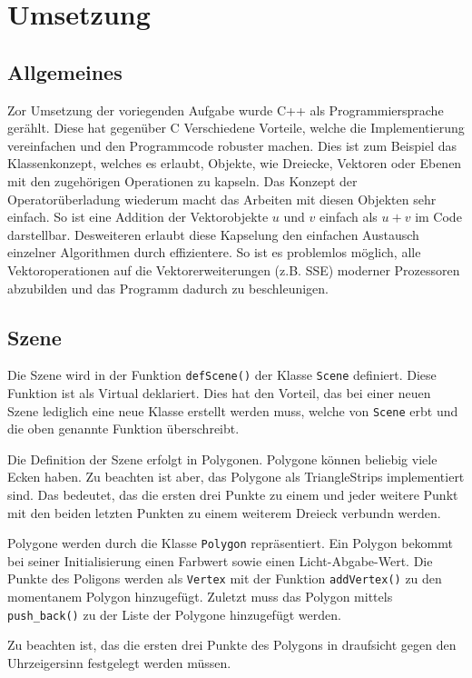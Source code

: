 \documentclass[final,a4paper,11pt,notitlepage,halfparskip]{scrreprt}
\begin{document}
\chapter{Umsetzung}
\section{Allgemeines}
Zor Umsetzung der voriegenden Aufgabe wurde C++ als Programmiersprache gerählt.
Diese hat gegenüber C Verschiedene Vorteile, welche die Implementierung
vereinfachen und den Programmcode robuster machen. Dies ist zum Beispiel das
Klassenkonzept, welches es erlaubt, Objekte, wie Dreiecke, Vektoren oder Ebenen
mit den zugehörigen Operationen zu kapseln. Das Konzept der Operatorüberladung
wiederum macht das Arbeiten mit diesen Objekten sehr einfach. So ist eine
Addition der Vektorobjekte $u$ und $v$ einfach als $u + v$ im Code darstellbar.
Desweiteren erlaubt diese Kapselung den einfachen Austausch einzelner
Algorithmen durch effizientere. So ist es problemlos möglich, alle
Vektoroperationen auf die Vektorerweiterungen (z.B. SSE) moderner Prozessoren 
abzubilden und das Programm dadurch zu beschleunigen.

\section{Szene}
Die Szene wird in der Funktion \texttt{defScene()} der Klasse \texttt{Scene}
definiert. Diese Funktion ist als Virtual deklariert. Dies hat den Vorteil, das
bei einer neuen Szene lediglich eine neue Klasse erstellt werden muss, welche
von \texttt{Scene} erbt und die oben genannte Funktion überschreibt.

Die Definition der Szene erfolgt in Polygonen. Polygone können beliebig viele
Ecken haben. Zu beachten ist aber, das Polygone als TriangleStrips implementiert
sind. Das bedeutet, das die ersten drei Punkte zu einem und jeder weitere Punkt 
mit den beiden letzten Punkten zu einem weiterem Dreieck verbundn werden.

Polygone werden durch die Klasse \texttt{Polygon} repräsentiert. Ein Polygon
bekommt bei seiner Initialisierung einen Farbwert sowie einen Licht-Abgabe-Wert.
Die Punkte des Poligons werden als \texttt{Vertex} mit der Funktion
\texttt{addVertex()} zu den momentanem Polygon hinzugefügt. Zuletzt muss das
Polygon mittels \texttt{push\_back()} zu der Liste der Polygone hinzugefügt
werden.

Zu beachten ist, das die ersten drei Punkte des Polygons in draufsicht gegen den
Uhrzeigersinn festgelegt werden müssen.
\end{document}

